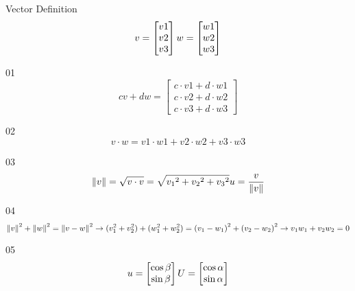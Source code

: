 \documentclass{article}
\begin{document}
\begin{section}{Vector}
  Definition
  \begin{equation}
  v = \begin{bmatrix}v1\\ v2\\ v3\end{bmatrix} 
  \\ w = \begin{bmatrix}w1\\ w2\\ w3\end{bmatrix}
  \end{equation}

  01
  \begin{equation}
  cv + dw = \begin{bmatrix}
    c\cdot v1+d\cdot w1\\ 
    c\cdot v2+d\cdot w2\\ 
    c\cdot v3+d\cdot w3
  \end{bmatrix}
  \end{equation}

  02
  \begin{equation}
  v\cdot w = v1\cdot w1 + v2\cdot w2 + v3\cdot w3
  \end{equation}

  03
  \begin{equation}
  \left \| v \right \| = \sqrt {v\cdot v} = \sqrt { {v_{1}}^{2} + {v_{2}}^{2} + {v_{3}}^{2} }
  \\ u = \frac {v}{\left \| v \right \|}
  \end{equation}

  04
  \begin{equation}
  {\left \| v \right \|}^{2} + {\left \| w \right \|}^{2} = {\left \| v - w \right \|}^{2}
  \\\rightarrow (v_{1}^{2} + v_{2}^{2}) + ( w_{1}^{2} + w_{2}^{2}) = {(v_{1} - w_{1})}^{2} + {(v_{2} - w_{2})}^{2}
  \\\rightarrow v_{1}w_{1} + v_{2}w_{2} = 0
  \end{equation}

  05
  \begin{equation}
  u=\begin{bmatrix}
  \cos \beta \\ 
  \sin \beta
  \end{bmatrix}

  \\ U=\begin{bmatrix}
  \cos \alpha  \\ 
  \sin \alpha
  \end{bmatrix}


\end{equation}
\end{section}
\end{document}
